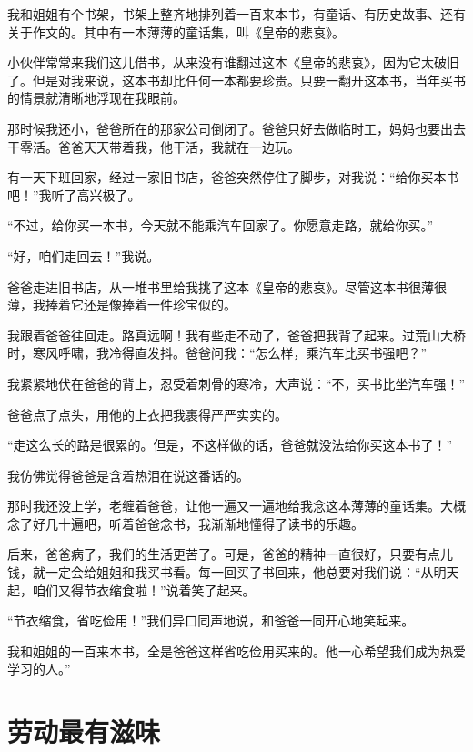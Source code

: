 \documentclass[12pt,UTF-8,openany]{ctexbook}
\begin{document}
\begin{Large}
    
    我和姐姐有个书架，书架上整齐地排列着一百来本书，有童话、有历史故事、还有关于作文的。其中有一本薄薄的童话集，叫《皇帝的悲哀》。
    
    小伙伴常常来我们这儿借书，从来没有谁翻过这本《皇帝的悲哀》，因为它太破旧了。但是对我来说，这本书却比任何一本都要珍贵。只要一翻开这本书，当年买书的情景就清晰地浮现在我眼前。
    
    那时候我还小，爸爸所在的那家公司倒闭了。爸爸只好去做临时工，妈妈也要出去干零活。爸爸天天带着我，他干活，我就在一边玩。
    
    有一天下班回家，经过一家旧书店，爸爸突然停住了脚步，对我说：“给你买本书吧！”我听了高兴极了。
    
    “不过，给你买一本书，今天就不能乘汽车回家了。你愿意走路，就给你买。”
    
    “好，咱们走回去！”我说。
    
    爸爸走进旧书店，从一堆书里给我挑了这本《皇帝的悲哀》。尽管这本书很薄很薄，我捧着它还是像捧着一件珍宝似的。
    
    我跟着爸爸往回走。路真远啊！我有些走不动了，爸爸把我背了起来。过荒山大桥时，寒风呼啸，我冷得直发抖。爸爸问我：“怎么样，乘汽车比买书强吧？”
    
    我紧紧地伏在爸爸的背上，忍受着刺骨的寒冷，大声说：“不，买书比坐汽车强！”
    
    爸爸点了点头，用他的上衣把我裹得严严实实的。
    
    “走这么长的路是很累的。但是，不这样做的话，爸爸就没法给你买这本书了！”
    
    我仿佛觉得爸爸是含着热泪在说这番话的。
    
    那时我还没上学，老缠着爸爸，让他一遍又一遍地给我念这本薄薄的童话集。大概念了好几十遍吧，听着爸爸念书，我渐渐地懂得了读书的乐趣。
    
    后来，爸爸病了，我们的生活更苦了。可是，爸爸的精神一直很好，只要有点儿钱，就一定会给姐姐和我买书看。每一回买了书回来，他总要对我们说：“从明天起，咱们又得节衣缩食啦！”说着笑了起来。
    
    “节衣缩食，省吃俭用！”我们异口同声地说，和爸爸一同开心地笑起来。
    
    我和姐姐的一百来本书，全是爸爸这样省吃俭用买来的。他一心希望我们成为热爱学习的人。”
    
\end{Large}

\chapter{劳动最有滋味}
\end{document}
